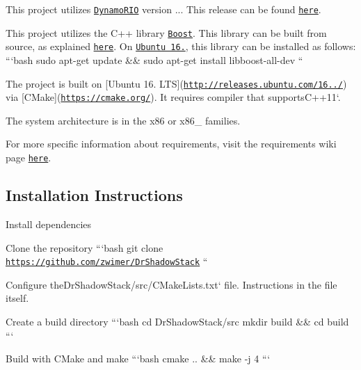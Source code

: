 \begin{DoxyEnumerate}
\item This project utilizes \href{https://github.com/DynamoRIO/dynamorio}{\tt Dynamo\-R\-I\-O} version {..}. This release can be found \href{https://github.com/DynamoRIO/dynamorio/releases/download/cronbuild-7.0.17636/DynamoRIO-x86_64-Linux-7.0.17636-0.tar.gz}{\tt here}.
\item This project utilizes the C++ library \href{https://boost.org}{\tt Boost}. This library can be built from source, as explained \href{https://www.boost.org/doc/libs/1_66_0/more/getting_started/unix-variants.html}{\tt here}. On \href{http://releases.ubuntu.com/16.04.4/}{\tt Ubuntu 16.}, this library can be installed as follows\-: ```bash sudo apt-\/get update \&\& sudo apt-\/get install libboost-\/all-\/dev ``{\ttfamily }
\item {\ttfamily The project is built on \mbox{[}Ubuntu 16. L\-T\-S\mbox{]}(\href{http://releases.ubuntu.com/16.04.4/}{\tt http\-://releases.\-ubuntu.\-com/16../}) via \mbox{[}C\-Make\mbox{]}(\href{https://cmake.org/}{\tt https\-://cmake.\-org/}). It requires compiler that supports}C++11`.
\item The system architecture is in the x86 or x86\-\_ families.
\end{DoxyEnumerate}

For more specific information about requirements, visit the requirements wiki page \href{https://github.com/zwimer/DrShadowStack/wiki/Requirements}{\tt here}.

\subsection*{Installation Instructions}


\begin{DoxyEnumerate}
\item Install dependencies
\item Clone the repository ```bash git clone \href{https://github.com/zwimer/DrShadowStack}{\tt https\-://github.\-com/zwimer/\-Dr\-Shadow\-Stack} ``{\ttfamily }
\item {\ttfamily Configure the}Dr\-Shadow\-Stack/src/\-C\-Make\-Lists.\-txt` file. Instructions in the file itself.
\item Create a build directory ```bash cd Dr\-Shadow\-Stack/src mkdir build \&\& cd build ```
\item Build with C\-Make and make ```bash cmake .. \&\& make -\/j 4 ```
\end{DoxyEnumerate}

